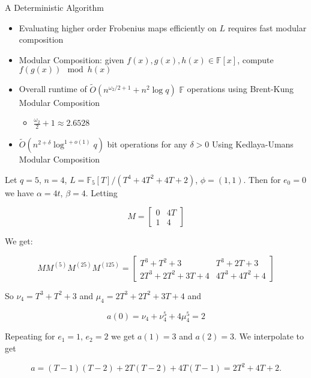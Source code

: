 \documentclass{beamer}
\newcommand{\ot}{\widetilde{O}}
\begin{document}

\begin{frame}{A Deterministic Algorithm}
    \begin{itemize}
    \item Evaluating higher order Frobenius maps efficiently on $L$ requires fast modular composition
    \item Modular Composition: given $f(x), g(x), h(x) \in \mathbb{F}[x]$, compute $f(g(x)) \mod h(x)$

        \item Overall runtime of $\ot(n^{\omega_2/2 + 1} + n^2 \log q)$ $\mathbb{F}$ operations using Brent-Kung Modular Composition
        \begin{itemize}
            \item $\frac{\omega_2}{2} + 1 \approx 2.6528$
        \end{itemize}
        \item $\ot(n^{2+\delta} \log^{1 + o(1)} q)$ bit operations for any $\delta > 0$ Using Kedlaya-Umans Modular Composition
    \end{itemize}
\end{frame}


\begin{frame}
\begin{example}
Let $q = 5$, $n = 4$, $L = \mathbb{F}_5[T]/(T^4 + 4T^2 + 4T + 2)$, $\phi = (1,1)$. Then for $e_0 = 0$ we have $\alpha = 4t$, $\beta = 4$. Letting

\[M = \begin{bmatrix}0 & 4T \\ 1 & 4 \end{bmatrix}\]

We get:

\[M M^{(5)} M^{(25)} M^{(125)} = \begin{bmatrix} T^3 + T^2 + 3 & T^3 + 2T + 3 \\ 2T^3 + 2T^2 + 3T + 4 & 4T^3 + 4T^2 + 4 \end{bmatrix}\]

So $\nu_4 = T^3 + T^2 + 3$ and $\mu_4 = 2T^3 + 2T^2 + 3T + 4$ and

\[a(0) = \nu_4 + \nu_4^5 + 4\mu_4^5 = 2\]


\end{example}
\end{frame}

\begin{frame}

\begin{example}
Repeating for $e_1 = 1$, $e_2 = 2$ we get $a(1) = 3$ and $a(2) = 3$. We interpolate to get

\[a = (T-1)(T-2) + 2T(T-2) + 4T(T-1)   = 2T^2 + 4T + 2.\]
\end{example}
    
\end{frame}
\end{document}
